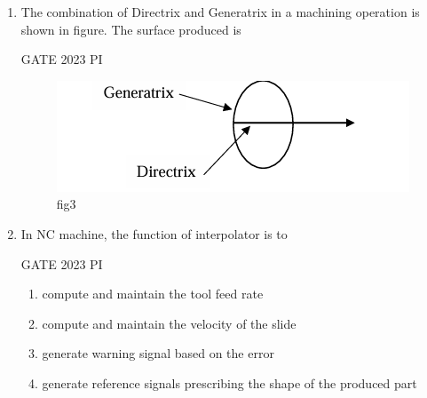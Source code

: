 \documentclass[journal,12pt,onecolumn]{IEEEtran}
\theoremstyle{remark}
\begin{document}
\begin{enumerate}
\textbf{51 \hspace{1em} A \hspace{1em} 36 \hspace{1em} \textbf{K} \hspace{1em} 5 \hspace{1em} V \hspace{1em} 23}

Here, \textbf{K} indicates that

\hfill{GATE 2023 PI}

\begin{multicols}{2}
\begin{enumerate}
    \item abrasive used in the wheel is aluminum oxide
    \item hardness of the wheel is medium
    \item bonding material of the wheel is shellac
    \item structure of the wheel is dense
\end{enumerate}
\end{multicols}
\item The combination of Directrix and Generatrix in a machining operation is shown in figure. The surface produced is

\hfill{GATE 2023 PI}
\begin{figure}[H]
    \centering
    \includegraphics[width=0.25\linewidth]{figs/Q.17.png}
    \caption{fig3}
    \label{fig:figs/Q.17.png}
\end{figure}
\item In NC machine, the function of interpolator is to

\hfill{GATE 2023 PI}

\begin{multicols}{2}
\begin{enumerate}
    \item compute and maintain the tool feed rate
    \item compute and maintain the velocity of the slide
    \item generate warning signal based on the error
    \item generate reference signals prescribing the shape of the produced part
\end{enumerate}
\end{multicols}


\end{enumerate}
\end{document}
